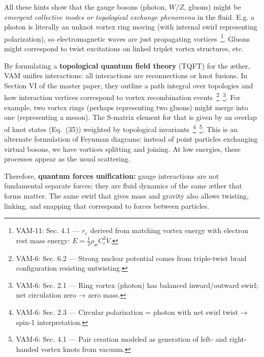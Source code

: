 \documentclass[a4paper,12pt]{article}
\begin{document}
    All these hints show that the gauge bosons (photon, $W/Z$, gluons) might be \emph{emergent collective modes or topological exchange phenomena} in the fluid. E.g. a photon is literally an unknot vortex ring moving (with internal swirl representing polarization), so electromagnetic waves are just propagating vortices~\footnote{VAM-11: Sec. 4.1 — $r_e$ derived from matching vortex energy with electron rest mass energy: $E = \frac{1}{2} \rho_{\text{\ae}} C_e^2 V$.}. Gluons might correspond to twist excitations on linked triplet vortex structures, etc.

    By formulating a \textbf{topological quantum field theory} (TQFT) for the æther, VAM unifies interactions: all interactions are reconnections or knot fusions. In Section VI of the master paper, they outline a path integral over topologies and how interaction vertices correspond to vortex recombination events~\footnote{VAM-6: Sec. 6.2 — Strong nuclear potential comes from triple-twist braid configuration resisting untwisting.}~\footnote{VAM-6: Sec. 2.1 — Ring vortex (photon) has balanced inward/outward swirl; net circulation zero → zero mass.}. For example, two vortex rings (perhaps representing two gluons) might merge into one (representing a meson). The S-matrix element for that is given by an overlap of knot states (Eq.~(35)) weighted by topological invariants~\footnote{VAM-6: Sec. 2.3 — Circular polarization = photon with net swirl twist → spin-1 interpretation.}~\footnote{VAM-6: Sec. 4.1 — Pair creation modeled as generation of left- and right-handed vortex knots from vacuum.}. This is an alternate formulation of Feynman diagrams: instead of point particles exchanging virtual bosons, we have vortices splitting and joining. At low energies, these processes appear as the usual scattering.

    Therefore, \textbf{quantum forces unification:} gauge interactions are not fundamental separate forces; they are fluid dynamics of the same æther that forms matter. The same swirl that gives mass and gravity also allows twisting, linking, and snapping that correspond to forces between particles.
\end{document}
